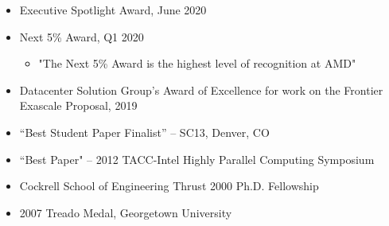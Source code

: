 \vspace{-0.3in}

\begin{itemize}
	\itemsep 0pt
	\item Executive Spotlight Award, June 2020
	\item Next 5\% Award, Q1 2020
	\begin{itemize}
	\item "The Next 5\% Award is the highest level of recognition at AMD"
	\end{itemize}
	\item Datacenter Solution Group’s Award of Excellence for work on the Frontier Exascale Proposal, 2019 
        \item ``Best Student Paper Finalist'' -- SC13, Denver, CO
	\item ``Best Paper" -- 2012 TACC-Intel Highly Parallel Computing
	      Symposium 
        \item Cockrell School of Engineering Thrust 2000 Ph.D. Fellowship
        \item 2007 Treado Medal, Georgetown University      
\end{itemize}

